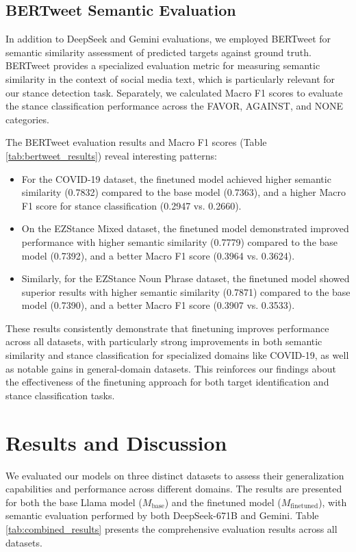 \documentclass[twocolumn,11pt,letterpaper]{article}
\begin{document}
\subsection{BERTweet Semantic Evaluation}
In addition to DeepSeek and Gemini evaluations, we employed BERTweet \cite{bertweet} for semantic similarity assessment of predicted targets against ground truth. BERTweet provides a specialized evaluation metric for measuring semantic similarity in the context of social media text, which is particularly relevant for our stance detection task. Separately, we calculated Macro F1 scores to evaluate the stance classification performance across the FAVOR, AGAINST, and NONE categories.

The BERTweet evaluation results and Macro F1 scores (Table \ref{tab:bertweet_results}) reveal interesting patterns:

\begin{itemize}
    \item For the COVID-19 dataset, the finetuned model achieved higher semantic similarity (0.7832) compared to the base model (0.7363), and a higher Macro F1 score for stance classification (0.2947 vs. 0.2660).
    \item On the EZStance Mixed dataset, the finetuned model demonstrated improved performance with higher semantic similarity (0.7779) compared to the base model (0.7392), and a better Macro F1 score (0.3964 vs. 0.3624).
    \item Similarly, for the EZStance Noun Phrase dataset, the finetuned model showed superior results with higher semantic similarity (0.7871) compared to the base model (0.7390), and a better Macro F1 score (0.3907 vs. 0.3533).
\end{itemize}

These results consistently demonstrate that finetuning improves performance across all datasets, with particularly strong improvements in both semantic similarity and stance classification for specialized domains like COVID-19, as well as notable gains in general-domain datasets. This reinforces our findings about the effectiveness of the finetuning approach for both target identification and stance classification tasks.

\section{Results and Discussion}
\label{sec:results}

We evaluated our models on three distinct datasets to assess their generalization capabilities and performance across different domains. The results are presented for both the base Llama model ($M_{\text{base}}$) and the finetuned model ($M_{\text{finetuned}}$), with semantic evaluation performed by both DeepSeek-671B and Gemini. Table \ref{tab:combined_results} presents the comprehensive evaluation results across all datasets.
\end{document}
